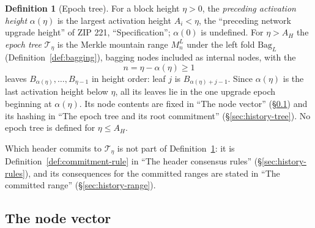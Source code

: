 \documentclass[11pt,a4paper]{article}
\theoremstyle{definition}
\newtheorem{definition}[theorem]{Definition}
\begin{document}
\begin{definition}[Epoch tree]\label{def:epoch-tree}
For a block height $\eta > 0$, the \emph{preceding activation height}
$\alpha(\eta)$ is the largest activation height $A_i < \eta$, the
``preceding network upgrade height'' of ZIP 221, ``Specification'';
$\alpha(0)$ is undefined. For $\eta > A_H$ the \emph{epoch tree}
$\mathcal{T}_\eta$ is the Merkle mountain range $M^L_n$ under the left fold
$\mathrm{Bag}_L$ (Definition~\ref{def:bagging}), bagging nodes included as
internal nodes, with the
\[
  n = \eta - \alpha(\eta) \ge 1
\]
leaves $B_{\alpha(\eta)}, \dots, B_{\eta-1}$ in height order: leaf $j$ is
$B_{\alpha(\eta)+j-1}$. Since $\alpha(\eta)$ is the last activation height
below $\eta$, all its leaves lie in the one upgrade epoch beginning at
$\alpha(\eta)$. Its node contents are fixed in ``The node vector''
(\S\ref{sec:history-nodes}) and its hashing in ``The epoch tree and its root
commitment'' (\S\ref{sec:history-tree}). No epoch tree is defined for
$\eta \le A_H$.
\end{definition}

Which header commits to $\mathcal{T}_\eta$ is not part of
Definition~\ref{def:epoch-tree}: it is Definition~\ref{def:commitment-rule}
in ``The header consensus rules'' (\S\ref{sec:history-rules}), and its
consequences for the committed ranges are stated in ``The committed range''
(\S\ref{sec:history-range}).

\subsection{The node vector}\label{sec:history-nodes}
\end{document}
